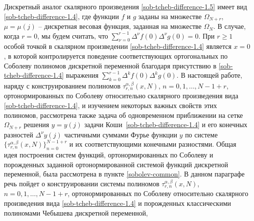 Дискретный аналог скалярного произведения \eqref{sob-tcheb-difference-1.5}  имеет вид \eqref{sob-tcheb-difference-1.4},
 где функции $f$ и $g$ заданы на  множестве $\Omega_{N+r}$, $\mu=\mu(j)$ -- дискретная весовая функция, заданная на множестве $\Omega_{N}$. В случае, когда $r=0$, мы будем считать, что $\sum_{\nu=0}^{r-1}\Delta^\nu f(0)\Delta^\nu g(0)=0$. При $r\ge1$ особой точкой в скалярном произведении \eqref{sob-tcheb-difference-1.4} является  $x=0$, в которой контролируется поведение соответствующих ортогональных по Соболеву полиномов дискретной переменной благодаря присутствию в  \eqref{sob-tcheb-difference-1.4} выражения  $\sum_{k=0}^{r-1}\Delta^kf(0)\Delta^kg(0)$.
В настоящей работе, наряду с конструированием полиномов $\tau _{r,n}^{\alpha,\beta}(x,N)$, $n=0,1,\ldots,N-1+r$, ортонормированных по Соболеву относительно скалярного произведения вида \eqref{sob-tcheb-difference-1.4}, и изучением некоторых важных свойств этих полиномов, рассмотрена также задача об одновременном приближении   на сетке $\Omega_{N+r}$ решения $y=y(j)$ задачи Коши~\eqref{sob-tcheb-difference-1.4} и его конечных разностей $\Delta^{\nu}y(j)$  частичными суммами Фурье функции $y$ по системе
$\{\tau _{r,n}^{\alpha,\beta}(x,N)\}_{n=0}^{N-1+r}$ и их соответствующими конечными разностями.
Общая идея построения систем функций, ортонормированных по Соболеву и порожденных заданной ортонормированной системой функций дискретной переменной, была рассмотрена в пункте \ref{sobolev-common}. В данном параграфе речь пойдет о конструировании системы полиномов $\tau _{r,n}^{\alpha,\beta}(x,N)$, $n=0,1,\ldots,N-1+r$,  ортонормированных  по Соболеву относительно скалярного произведения вида \eqref{sob-tcheb-difference-1.4} и порожденных классическими полиномами Чебышева дискретной переменной,


